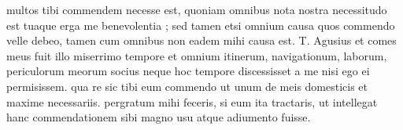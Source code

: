 


multos tibi commendem necesse est, quoniam omnibus nota nostra necessitudo est tuaque erga me benevolentia ;
sed tamen etsi omnium causa quos commendo velle debeo, tamen cum omnibus non eadem mihi causa est.  T. Agusius et comes meus fuit illo miserrimo tempore et omnium itinerum, navigationum, laborum, periculorum meorum
socius neque hoc tempore discessisset a me nisi ego ei permisissem. qua re sic tibi eum commendo ut unum de meis domesticis et maxime necessariis. pergratum mihi feceris, si eum ita tractaris, ut intellegat hanc commendationem sibi magno usu atque adiumento fuisse.

